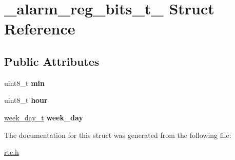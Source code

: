 \hypertarget{struct__alarm__reg__bits__t__}{}\section{\+\_\+alarm\+\_\+reg\+\_\+bits\+\_\+t\+\_\+ Struct Reference}
\label{struct__alarm__reg__bits__t__}
\subsection*{Public Attributes}
\begin{DoxyCompactItemize}
\item 
\mbox{\label{struct__alarm__reg__bits__t___aa410c99599de1671d541818085b20ab5}} 
uint8\+\_\+t {\bfseries min}
\item 
\mbox{\label{struct__alarm__reg__bits__t___aa2ae3b5d38944af63e088c5f02d13273}} 
uint8\+\_\+t {\bfseries hour}
\item 
\mbox{\label{struct__alarm__reg__bits__t___abcf40a8e95bd778930e4970dc78e050d}} 
\hyperlink{union__week__day__t__}{week\+\_\+day\+\_\+t} {\bfseries week\+\_\+day}
\end{DoxyCompactItemize}


The documentation for this struct was generated from the following file\+:\begin{DoxyCompactItemize}
\item 
\hyperlink{rtc_8h}{rtc.\+h}\end{DoxyCompactItemize}

